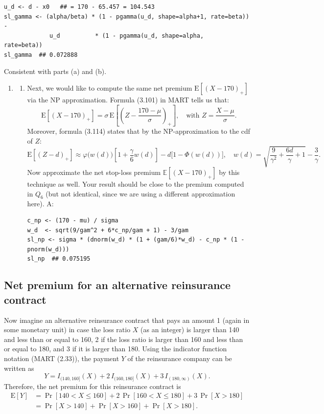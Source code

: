 \documentclass{article}
\begin{document}
\begin{enumerate}
\begin{enumerate}
\begin{lstlisting}
u_d <- d - x0   ## = 170 - 65.457 = 104.543
sl_gamma <- (alpha/beta) * (1 - pgamma(u_d, shape=alpha+1, rate=beta)) -
             u_d          * (1 - pgamma(u_d, shape=alpha,   rate=beta))
sl_gamma  ## 0.072888
\end{lstlisting}

      Consistent with parts (a) and (b).
    \end{enumerate}
\end{enumerate}

\newpage
\begin{enumerate}
  \item[$\boldsymbol{Q_7}$]
    \begin{enumerate}
      \item[] Next, we would like to compute the same net premium $\mathrm{E}[(X-170)_+]$ via the NP approximation. Formula (3.101) in MART tells us that:
      \[
        \mathrm{E}[(X-170)_+] = \sigma\,\mathrm{E}\!\left[\left(Z - \frac{170-\mu}{\sigma}\right)_+\right], \quad \text{with } Z = \frac{X-\mu}{\sigma}.
      \]
      Moreover, formula (3.114) states that by the NP-approximation to the cdf of $Z$:
      \[
        \mathrm{E}[(Z-d)_+] \approx \varphi\!\bigl(w(d)\bigr)\!\left[1 + \frac{\gamma}{6}w(d)\right] - d\bigl[1-\Phi(w(d))\bigr],
        \quad w(d) = \sqrt{\frac{9}{\gamma^2} + \frac{6d}{\gamma} + 1} - \frac{3}{\gamma}.
      \]
      Now approximate the net stop-loss premium $\mathbb{E}[(X-170)_{+}]$ by this technique as well. Your result should be close to the premium computed in $Q_6$ (but not identical, since we are using a diﬀerent approximation here). A:

\begin{lstlisting}
c_np <- (170 - mu) / sigma
w_d  <- sqrt(9/gam^2 + 6*c_np/gam + 1) - 3/gam
sl_np <- sigma * (dnorm(w_d) * (1 + (gam/6)*w_d) - c_np * (1 - pnorm(w_d)))
sl_np  ## 0.075195
\end{lstlisting}
    \end{enumerate}
\end{enumerate}

\newpage
\subsection*{Net premium for an alternative reinsurance contract}
Now imagine an alternative reinsurance contract that pays an amount 1 (again in some monetary unit) in case the loss ratio $X$ (as an integer) is larger than 140 and less than or equal to 160, 2 if the loss ratio is larger than 160 and less than or equal to 180, and 3 if it is larger than 180. Using the indicator function notation (MART (2.33)), the payment $Y$ of the reinsurance company can be written as
\[
  Y = I_{(140,160]}(X) + 2\,I_{(160,180]}(X) + 3\,I_{(180,\infty)}(X).
\]
Therefore, the net premium for this reinsurance contract is
\begin{align*}
  \mathrm{E}[Y] &= \Pr[140 < X \leq 160] + 2\,\Pr[160 < X \leq 180] + 3\,\Pr[X > 180]\\
                &= \Pr[X > 140] + \Pr[X > 160] + \Pr[X > 180].
\end{align*}
\end{document}
